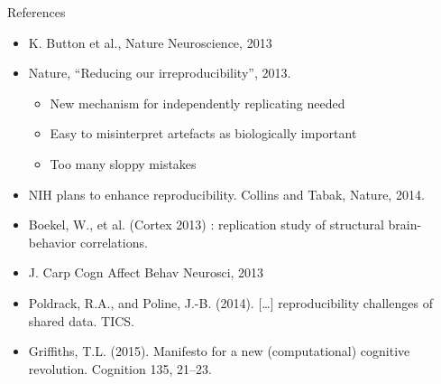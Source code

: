 \documentclass[ignorenonframetext,]{beamer}
\begin{document}
\begin{frame}{References}

\begin{itemize}
\itemsep1pt\parskip0pt
\item
  K. Button et al., Nature Neuroscience, 2013
\item
  Nature, ``Reducing our irreproducibility'', 2013.

  \begin{itemize}
  \itemsep1pt\parskip0pt
  \item
    New mechanism for independently replicating needed
  \item
    Easy to misinterpret artefacts as biologically important
  \item
    Too many sloppy mistakes
  \end{itemize}
\item
  NIH plans to enhance reproducibility. Collins and Tabak, Nature, 2014.
\item
  Boekel, W., et al. (Cortex 2013) : replication study of structural
  brain-behavior correlations.
\item
  J. Carp Cogn Affect Behav Neurosci, 2013
\item
  Poldrack, R.A., and Poline, J.-B. (2014). {[}\ldots{}{]}
  reproducibility challenges of shared data. TICS.
\item
  Griffiths, T.L. (2015). Manifesto for a new (computational) cognitive
  revolution. Cognition 135, 21--23.
\end{itemize}

\end{frame}

\end{document}
